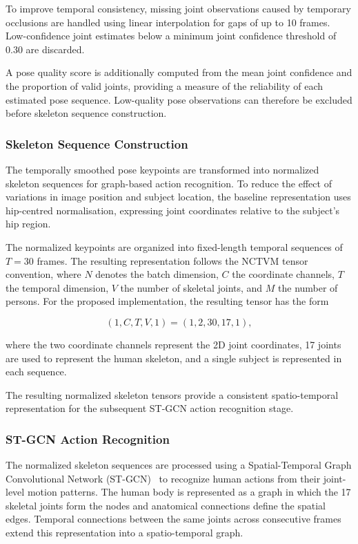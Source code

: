 \documentclass[runningheads]{llncs}
\begin{document}
To improve temporal consistency, missing joint observations caused by
temporary occlusions are handled using linear interpolation for gaps of
up to 10 frames. Low-confidence joint estimates below a minimum joint
confidence threshold of 0.30 are discarded. 

A pose quality score is additionally computed from the mean joint
confidence and the proportion of valid joints, providing a measure of
the reliability of each estimated pose sequence. Low-quality pose
observations can therefore be excluded before skeleton sequence
construction.

\subsubsection{Skeleton Sequence Construction}

The temporally smoothed pose keypoints are transformed into normalized
skeleton sequences for graph-based action recognition. To reduce the
effect of variations in image position and subject location, the
baseline representation uses hip-centred normalisation, expressing
joint coordinates relative to the subject's hip region.

The normalized keypoints are organized into fixed-length temporal
sequences of $T=30$ frames. The resulting representation follows the
NCTVM tensor convention, where $N$ denotes the batch dimension, $C$ the
coordinate channels, $T$ the temporal dimension, $V$ the number of
skeletal joints, and $M$ the number of persons. For the proposed
implementation, the resulting tensor has the form

\begin{equation}
(1,C,T,V,1)=(1,2,30,17,1),
\end{equation}

where the two coordinate channels represent the 2D joint coordinates,
17 joints are used to represent the human skeleton, and a single
subject is represented in each sequence.

The resulting normalized skeleton tensors provide a consistent
spatio-temporal representation for the subsequent ST-GCN action
recognition stage.

\subsubsection{ST-GCN Action Recognition}

The normalized skeleton sequences are processed using a
Spatial-Temporal Graph Convolutional Network (ST-GCN)~\cite{stgcn} to
recognize human actions from their joint-level motion patterns. The
human body is represented as a graph in which the 17 skeletal joints
form the nodes and anatomical connections define the spatial edges.
Temporal connections between the same joints across consecutive frames
extend this representation into a spatio-temporal graph.
\end{document}
